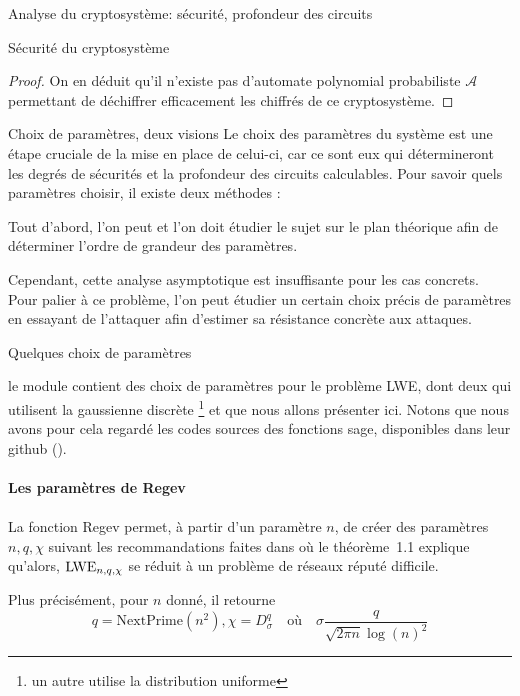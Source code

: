 \begin{section}{Analyse du cryptosystème: sécurité, profondeur des circuits}
\begin{subsection}{Sécurité du cryptosystème}
\begin{proof}
	On en déduit qu'il n'existe pas d'automate polynomial probabiliste
	$\mathcal{A}$ permettant de déchiffrer efficacement les chiffrés de ce cryptosystème.
	\end{proof}
	
	\end{subsection}
	\begin{subsection}{Choix de paramètres, deux visions}
	Le choix des paramètres du système est une étape cruciale de la mise en place de celui-ci,
	car ce sont eux qui détermineront les degrés de sécurités et la profondeur des circuits calculables.
	Pour savoir quels paramètres choisir, il existe deux méthodes :
	
	Tout d'abord, l'on peut et l'on doit étudier le sujet sur le plan théorique afin de déterminer
	l'ordre de grandeur des paramètres.
	
	Cependant, cette analyse asymptotique est insuffisante pour les cas concrets. Pour palier à ce
	problème, l'on peut étudier un certain choix précis de paramètres en essayant de l'attaquer afin
	d'estimer sa résistance concrète aux attaques.
	
	\begin{subsubsection}{Quelques choix de paramètres}

	le module  contient des choix de paramètres pour
	le problème LWE, dont deux qui utilisent la gaussienne discrète
	\footnote{un autre utilise la distribution uniforme}
	et que nous allons présenter ici. Notons que nous avons pour cela 
	regardé les codes 
	sources des fonctions sage, disponibles dans leur github (\cite{sage}).

	\paragraph{}
	\textbf{Les paramètres de Regev}
	\paragraph{}

	La fonction Regev permet, à partir d'un paramètre $n$, de 
	créer des paramètres $n, q, \chi$ suivant les recommandations  
	faites dans \cite{STOC:Regev05} où le théorème~1.1 explique 
	qu'alors, $\text{LWE}_{n,q,\chi}$ se réduit à un problème de réseaux réputé 
	difficile.

	Plus précisément, pour $n$ donné, il retourne
	\[q = \text{NextPrime}(n^2), \chi = D^q_\sigma\quad\text{où}\quad
		\sigma \frac{q}{\sqrt{2 \pi n} \log(n)^2}\]


\end{subsubsection}
\end{subsection}
\end{section}
